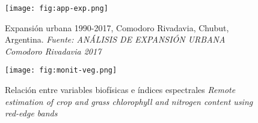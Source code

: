 \begin{frame}{}
  \begin{figure}
    \centering
    \texttt{[image: fig:app-exp.png]}
    \caption{Expansión urbana 1990-2017, Comodoro Rivadavia, Chubut, Argentina. \emph{Fuente: ANÁLISIS DE
EXPANSIÓN URBANA Comodoro Rivadavia 2017}}
    \label{}
  \end{figure}
\end{frame}

\begin{frame}{}
  \begin{figure}
    \centering
    \texttt{[image: fig:monit-veg.png]}
    \caption{Relación entre variables biofísicas e índices espectrales \emph{Remote estimation of crop and grass chlorophyll and nitrogen content using
red-edge bands}}
    \label{}
  \end{figure}
\end{frame}



\gracias
